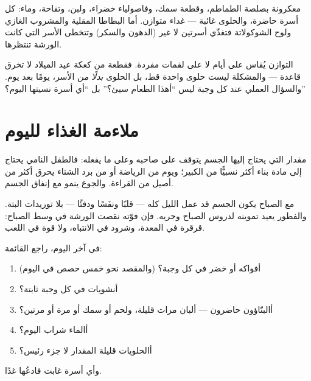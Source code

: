 \begin{example}\label{ex:g3:balanced-diet:lunch}
معكرونة بصلصة الطماطم، وقطعة سمك، وفاصولياء خضراء، ولبن، وتفاحة،
وماء: كل أسرة حاضرة، والحلوى غائبة --- غداء متوازن. أما البطاطا
المقلية والمشروب الغازي ولوح الشوكولاتة فتغذّي أسرتين لا غير
(الدهون والسكر) وتتخطى الأسر التي كانت الورشة تنتظرها.
\end{example}

\begin{remark}\label{rem:g3:balanced-diet:balance}
التوازن يُقاس على أيام لا على لقمات مفردة. فقطعة من كعكة عيد
الميلاد لا تخرق قاعدة --- والمشكلة ليست حلوى واحدة قط، بل الحلوى
\emph{بدلًا من} الأسر، يومًا بعد يوم. والسؤال العملي عند كل وجبة
ليس ``أهذا الطعام سيئ؟'' بل ``أي أسرة نسيتها اليوم؟''
\end{remark}

\section{ملاءمة الغذاء لليوم}

\begin{proposition}\label{prop:g3:balanced-diet:needs}
مقدار  التي يحتاج إليها الجسم يتوقف على صاحبه وعلى ما
يفعله: فالطفل النامي يحتاج إلى مادة بناء أكثر نسبيًّا من الكبير؛
ويوم من الرياضة أو من برد الشتاء يحرق  أكثر من أصيل من
القراءة. والجوع ينمو مع إنفاق الجسم.
\end{proposition}
\admitted

\begin{example}\label{ex:g3:balanced-diet:breakfast}
مع الصباح يكون الجسم قد عمل الليل كله --- قلبًا ونفَسًا ودفئًا ---
بلا توريدات البتة. والفطور يعيد تموينه لدروس الصباح وجريه. فإن
فوّته نقصت الورشة في وسط الصباح: قرقرة في المعدة، وشرود في الانتباه،
ولا قوة في اللعب.
\end{example}

\begin{method}\label{met:g3:balanced-diet:check}
في آخر اليوم، راجع القائمة:
\begin{enumerate}
  \item أفواكه أو خضر في كل وجبة؟ (والمقصد نحو خمس حصص في اليوم)
  \item أنشويات في كل وجبة  ثابتة؟
  \item أالبنّاؤون حاضرون --- ألبان مرات قليلة، ولحم أو سمك أو
         مرة أو مرتين؟
  \item أالماء شراب اليوم؟
  \item أالحلويات قليلة المقدار لا جزء رئيس؟
\end{enumerate}
وأي أسرة غابت فادعُها غدًا.
\end{method}

